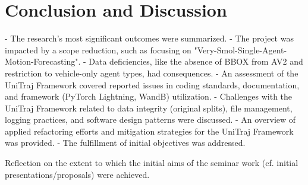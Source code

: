 
\section{Conclusion and Discussion}
\label{ch:conclusion_future}
- The research's most significant outcomes were summarized.
- The project was impacted by a scope reduction, such as focusing on "Very-Smol-Single-Agent-Motion-Forecasting".
- Data deficiencies, like the absence of BBOX from AV2 and restriction to vehicle-only agent types, had consequences.
- An assessment of the UniTraj Framework covered reported issues in coding standards, documentation, and framework (PyTorch Lightning, WandB) utilization.
- Challenges with the UniTraj Framework related to data integrity (original splits), file management, logging practices, and software design patterns were discussed.
- An overview of applied refactoring efforts and mitigation strategies for the UniTraj Framework was provided.
- The fulfillment of initial objectives was addressed.


\label{sec:conclusion_objectives}
Reflection on the extent to which the initial aims of the seminar work (cf. initial presentations/proposals) were achieved.
